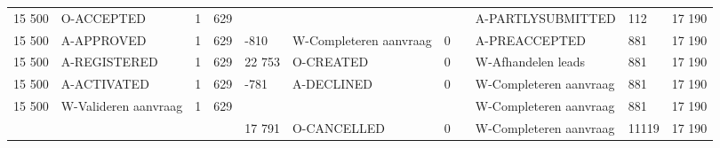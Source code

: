 \begin{tabular}{lllllllllll}
15 500 & O-ACCEPTED & 1 & 629 &  &  &  &  & A-PARTLYSUBMITTED & 112 & 17 190 \\
15 500 & A-APPROVED & 1 & 629 & -810 & W-Completeren aanvraag & 0 &  & A-PREACCEPTED & 881 & 17 190 \\
15 500 & A-REGISTERED & 1 & 629 & 22 753 & O-CREATED & 0 &  & W-Afhandelen leads & 881 & 17 190 \\
15 500 & A-ACTIVATED & 1 & 629 & -781 & A-DECLINED & 0 &  & W-Completeren aanvraag & 881 & 17 190 \\
15 500 & W-Valideren aanvraag & 1 & 629 &  &  &  &  & W-Completeren aanvraag & 881 & 17 190 \\
 &  &  &  & 17 791 & O-CANCELLED & 0 &  & W-Completeren aanvraag & 11119 & 17 190 \\
\bottomrule
\end{tabular}
